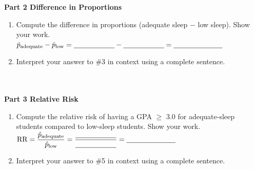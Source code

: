 \documentclass[10pt]{article}
\begin{document}
\vspace{0.22in}

{\large\bfseries\color{navy} Part 2 \quad Difference in Proportions}

\vspace{0.1in}

\begin{enumerate}[resume]

    \item Compute the difference in proportions (adequate sleep $-$ low sleep). Show your work.\\[10pt]
          $\hat{p}_{\text{adequate}} - \hat{p}_{\text{low}} = \blank{2cm} - \blank{2cm} = \blank{2.4cm}$

    \vspace{0.16in}

    \item Interpret your answer to \#3 in context using a complete sentence.\\[8pt]
          \writeline\\[2pt]\writeline\\[2pt]\writeline

\end{enumerate}

\vspace{0.22in}

{\large\bfseries\color{navy} Part 3 \quad Relative Risk}

\vspace{0.1in}

\begin{enumerate}[resume]

    \item Compute the relative risk of having a GPA $\geq$ 3.0 for adequate-sleep students
          compared to low-sleep students. Show your work.\\[10pt]
          $\text{RR} = \dfrac{\hat{p}_{\text{adequate}}}{\hat{p}_{\text{low}}}
          = \dfrac{\blank{2cm}}{\blank{2cm}} = \blank{2.4cm}$

    \vspace{0.16in}

    \item Interpret your answer to \#5 in context using a complete sentence.\\[8pt]
          \writeline\\[2pt]\writeline\\[2pt]\writeline

\end{enumerate}
\end{document}
